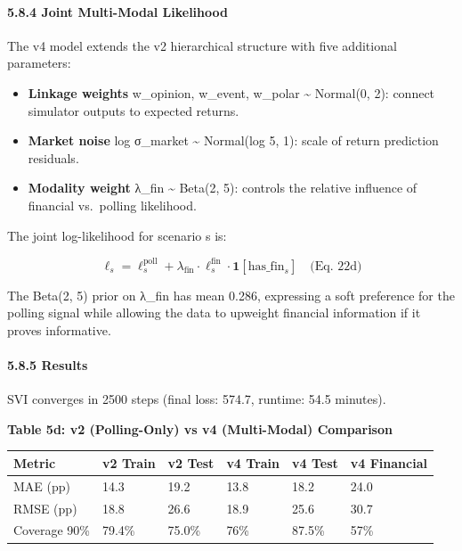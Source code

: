 \documentclass[
]{article}
\providecommand{\tightlist}{%
  \setlength{\itemsep}{0pt}\setlength{\parskip}{0pt}}
\begin{document}
\paragraph{5.8.4 Joint Multi-Modal
Likelihood}\label{joint-multi-modal-likelihood}

The v4 model extends the v2 hierarchical structure with five additional
parameters:

\begin{itemize}
\tightlist
\item
  \textbf{Linkage weights} w\_opinion, w\_event, w\_polar
  \textasciitilde{} Normal(0, 2): connect simulator outputs to expected
  returns.
\item
  \textbf{Market noise} log σ\_market \textasciitilde{} Normal(log 5,
  1): scale of return prediction residuals.
\item
  \textbf{Modality weight} λ\_fin \textasciitilde{} Beta(2, 5): controls
  the relative influence of financial vs.~polling likelihood.
\end{itemize}

The joint log-likelihood for scenario s is:

\[\ell_s = \ell_s^{\text{poll}} + \lambda_{\text{fin}} \cdot \ell_s^{\text{fin}} \cdot \mathbf{1}[\text{has\_fin}_s] \quad \text{(Eq. 22d)}\]

The Beta(2, 5) prior on λ\_fin has mean 0.286, expressing a soft
preference for the polling signal while allowing the data to upweight
financial information if it proves informative.

\paragraph{5.8.5 Results}\label{results}

SVI converges in 2500 steps (final loss: 574.7, runtime: 54.5 minutes).

\textbf{Table 5d: v2 (Polling-Only) vs v4 (Multi-Modal) Comparison}

\begin{longtable}[]{@{}llllll@{}}
\toprule\noalign{}
Metric & v2 Train & v2 Test & v4 Train & v4 Test & v4 Financial \\
\midrule\noalign{}
\endhead
\bottomrule\noalign{}
\endlastfoot
MAE (pp) & 14.3 & 19.2 & 13.8 & 18.2 & 24.0 \\
RMSE (pp) & 18.8 & 26.6 & 18.9 & 25.6 & 30.7 \\
Coverage 90\% & 79.4\% & 75.0\% & 76\% & 87.5\% & 57\% \\
\end{longtable}
\end{document}
